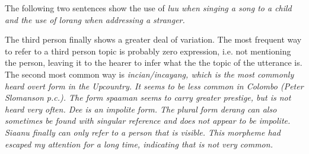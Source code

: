 The following two sentences show the use of \em luu \em when singing a song to a child and the use of \em lorang \em when addressing a stranger.







The third person finally shows a greater deal of variation. The most frequent way to refer to a third person topic is probably zero expression, i.e. not mentioning the person, leaving it to the hearer to infer what the the topic of the utterance is. The second most common way is \em incian/incayang, \em which is the most commonly heard overt form in the Upcountry. It seems to be less common in Colombo (Peter Slomanson p.c.). The form \em spaaman \em seems to carry greater prestige, but is not heard very often. \em Dee \em is an impolite form. The plural form \em derang \em can also sometimes be found with singular reference and does not appear to be impolite. \em Siaanu \em finally can only refer to a person that is visible. This morpheme had escaped my attention for a long time, indicating that is not very common.


